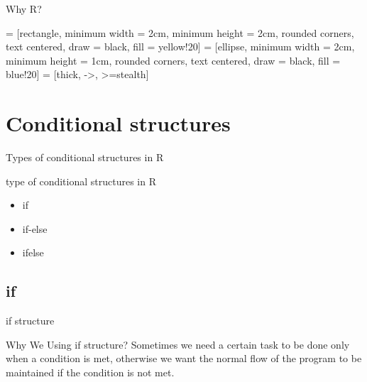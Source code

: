 \documentclass{beamer}\usepackage[]{graphicx}\usepackage[]{xcolor}
\begin{document}
\begin{frame}{Why R?}

     = [rectangle, minimum width = 2cm, minimum height = 2cm, 
    rounded corners, text centered, draw = black, fill = yellow!20]
     = [ellipse, minimum width = 2cm, minimum height = 1cm, 
    rounded corners, text centered, draw = black, fill = blue!20]
     = [thick, ->, >=stealth]




\end{frame}
\section{Conditional structures}
\begin{frame}{Types of conditional structures in R}
    \begin{alertblock}{type of conditional structures in R}
        \begin{itemize}
            \item if
            \item if-else 
            \item ifelse
        \end{itemize}
    \end{alertblock}
\end{frame}




\subsection{if}





\begin{frame}{if structure}
\begin{block}{Why We Using if structure?}
    Sometimes we need a certain task to be done only when a condition is met, otherwise we want the normal flow of the program to be maintained if the condition is not met.
\end{block}
\end{frame}
\end{document}
